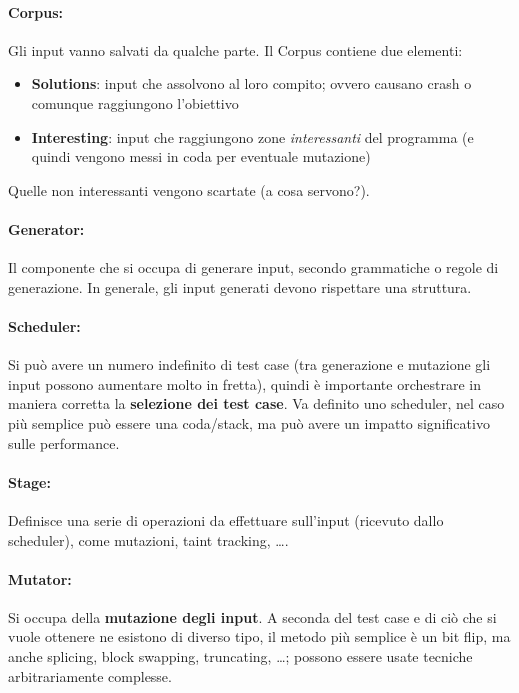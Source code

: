 \paragraph{Corpus:} Gli input vanno salvati da qualche parte. Il Corpus contiene due elementi:
\begin{itemize}
	\item \textbf{Solutions}: input che assolvono al loro compito; ovvero causano crash o comunque raggiungono l'obiettivo

	\item \textbf{Interesting}: input che raggiungono zone \textit{interessanti} del programma (e quindi vengono messi in coda per eventuale mutazione)
\end{itemize}
Quelle non interessanti vengono scartate (a cosa servono?).

\paragraph{Generator:} Il componente che si occupa di generare input, secondo grammatiche o regole di generazione. In generale, gli input generati devono rispettare una struttura.

\paragraph{Scheduler:} Si può avere un numero indefinito di test case (tra generazione e mutazione gli input possono aumentare molto in fretta), quindi è importante orchestrare in maniera corretta la \textbf{selezione dei test case}. Va definito uno scheduler, nel caso più semplice può essere una coda/stack, ma può avere un impatto significativo sulle performance.

\paragraph{Stage:} Definisce una serie di operazioni da effettuare sull'input (ricevuto dallo scheduler), come mutazioni, taint tracking, \dots.

\paragraph{Mutator:} Si occupa della \textbf{mutazione degli input}. A seconda del test case e di ciò che si vuole ottenere ne esistono di diverso tipo, il metodo più semplice è un bit flip, ma anche splicing, block swapping, truncating, \dots; possono essere usate tecniche arbitrariamente complesse.


